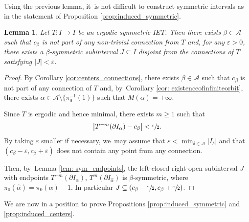 \documentclass[10pt,a4paper]{amsart}
\let\epsilon\varepsilon
\theoremstyle{plain}
\newtheorem{lemma}[theorem]{Lemma}
\theoremstyle{definition}
\newcommand{\A}{\mathcal{A}}
\begin{document}
Using the previous lemma, it~is not difficult to construct symmetric intervals as in the statement of Proposition \ref{prop:induced_symmetric}.

\begin{lemma}
\label{lem:sym_int_disjoint}
Let $T: I \to I$ be an ergodic symmetric IET. Then there exists $\beta \in \A$ such that $c_\beta$ is not part of any non-trivial connection from $T$ and, for any $\epsilon > 0$, there exists a $\beta$-symmetric subinterval $J\subseteq I$ disjoint from the connections of $T$ satisfying $|J| < \epsilon$.
\end{lemma}

\begin{proof}
By Corollary \ref{cor:centers_connections}, there exists $\beta \in \A$ such that $c_\beta$ is not part of any connection of $T$ and, by~Corollary \ref{cor: existenceofinfiniteorbit}, there exists $\alpha \in \A \setminus \{\pi_0^{-1}(1)\}$ such that $M(\alpha) = +\infty$.

Since $T$ is ergodic and hence minimal, there exists $m \geq 1$ such that
\[
\big|T^{-m}(\partial I_\alpha) - c_\beta \big| < \sfrac{\epsilon}{2}.
\]
By taking $\epsilon$ smaller if necessary, we~may assume that $\epsilon < \min_{\delta \in \A} |I_\delta|$ and that $(c_\beta - \epsilon, c_\beta + \epsilon)$ does not contain any point from any connection.

Then, by~Lemma \ref{lem: sym_endpoints}, the left-closed right-open subinterval $J$ with endpoints $T^{-m}(\partial I_\alpha)$, $T^{m}(\partial I_{\hat \alpha})$ is $\beta$-symmetric, where $\pi_0(\hat \alpha) = \pi_0(\alpha) - 1$. In particular $J \subseteq (c_\beta - \sfrac{\epsilon}{2}, c_\beta + \sfrac{\epsilon}{2})$.
\end{proof}

We are now in a position to prove Propositions \ref{prop:induced_symmetric} and \ref{prop:induced_centers}.
\end{document}
